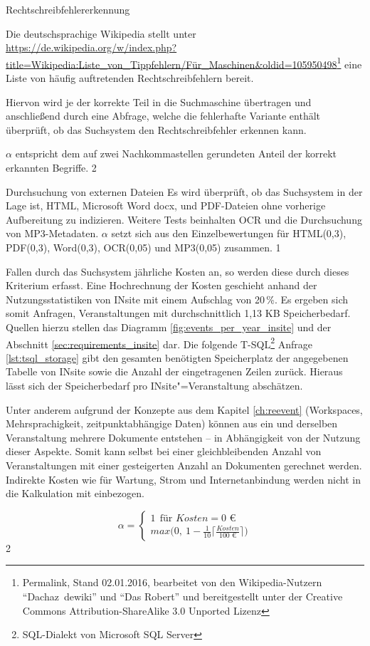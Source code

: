 \myTestDefinition
{Rechtschreibfehlererkennung}
{
Die deutschsprachige Wikipedia stellt unter \url{https://de.wikipedia.org/w/index.php?title=Wikipedia:Liste_von_Tippfehlern/Für_Maschinen&oldid=105950498}\footnote{Permalink, Stand 02.01.2016, bearbeitet von den Wikipedia-Nutzern \enquote{Dachaz~dewiki} und \enquote{Das Robert} und bereitgestellt unter der Creative Commons Attribution-ShareAlike 3.0 Unported Lizenz
} eine Liste von  häufig auftretenden Rechtschreibfehlern bereit.

Hiervon wird je der korrekte Teil in die Suchmaschine übertragen und anschließend durch eine Abfrage, welche die fehlerhafte Variante enthält überprüft, ob das Suchsystem den Rechtschreibfehler erkennen kann.
}
{
$\alpha$ entspricht dem auf zwei Nachkommastellen gerundeten Anteil der korrekt erkannten Begriffe.
}
{2}

\myTestDefinition
{Durchsuchung von externen Dateien}
{Es wird überprüft, ob das Suchsystem in der Lage ist, HTML, Microsoft Word docx, und PDF-Dateien ohne vorherige Aufbereitung zu indizieren. Weitere Tests beinhalten OCR und die Durchsuchung von MP3-Metadaten.
}
{$\alpha$ setzt sich aus den Einzelbewertungen für HTML(0,3), PDF(0,3), Word(0,3), OCR(0,05) und MP3(0,05) zusammen.}
{1}

{
Fallen durch das Suchsystem jährliche Kosten an, so werden diese durch dieses Kriterium erfasst. Eine Hochrechnung der Kosten geschieht anhand der Nutzungsstatistiken von INsite mit einem Aufschlag von 20\,\%. Es ergeben sich somit  Anfragen,  Veranstaltungen mit durchschnittlich 1,13 KB Speicherbedarf. Quellen hierzu stellen das Diagramm \ref{fig:events_per_year_insite} und der Abschnitt \ref{sec:requirements_insite} dar. Die folgende T-SQL\footnote{SQL-Dialekt von Microsoft SQL Server} Anfrage \ref{lst:tsql_storage} gibt den gesamten benötigten Speicherplatz der angegebenen Tabelle von INsite sowie die Anzahl der eingetragenen Zeilen zurück. Hieraus lässt sich der Speicherbedarf pro INsite"=Veranstaltung abschätzen.

Unter anderem aufgrund der Konzepte aus dem Kapitel \ref{ch:reevent} (Workspaces, Mehrsprachigkeit, zeitpunktabhängige Daten) können aus ein und derselben Veranstaltung mehrere Dokumente entstehen -- in Abhängigkeit von der Nutzung dieser Aspekte. Somit kann selbst bei einer gleichbleibenden Anzahl von Veranstaltungen mit einer gesteigerten Anzahl an Dokumenten gerechnet werden.
Indirekte Kosten wie für Wartung, Strom und Internetanbindung werden nicht in die Kalkulation mit einbezogen.
}
{
\begin{equation}
\alpha =
\begin{cases}
	1 ~~ \text{für } Kosten = 0 \text{ €}\\
	max\big(0,~1 - \frac{1}{10} \lceil \frac{Kosten}{100 \text{ €}} \rceil \big)
\end{cases}
\end{equation}
}
{2}

